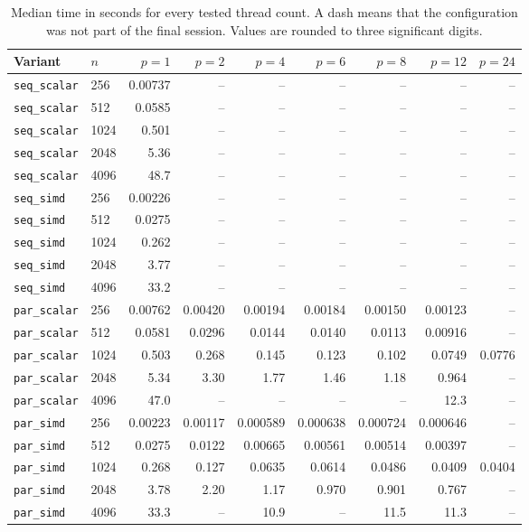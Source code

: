 \documentclass[a4paper,11pt]{article}
\begin{document}
\begin{table}[htbp]
\centering
\scriptsize
\caption{Median time in seconds for every tested thread count. A dash means
that the configuration was not part of the final session. Values are rounded
to three significant digits.}
\begin{tabular}{@{}llrrrrrrr@{}}
\toprule
Variant & $n$ & $p=1$ & $p=2$ & $p=4$ & $p=6$ & $p=8$ & $p=12$ & $p=24$\\
\midrule
\texttt{seq\_scalar} & 256 & 0.00737 & -- & -- & -- & -- & -- & --\\
\texttt{seq\_scalar} & 512 & 0.0585 & -- & -- & -- & -- & -- & --\\
\texttt{seq\_scalar} & 1024 & 0.501 & -- & -- & -- & -- & -- & --\\
\texttt{seq\_scalar} & 2048 & 5.36 & -- & -- & -- & -- & -- & --\\
\texttt{seq\_scalar} & 4096 & 48.7 & -- & -- & -- & -- & -- & --\\
\texttt{seq\_simd} & 256 & 0.00226 & -- & -- & -- & -- & -- & --\\
\texttt{seq\_simd} & 512 & 0.0275 & -- & -- & -- & -- & -- & --\\
\texttt{seq\_simd} & 1024 & 0.262 & -- & -- & -- & -- & -- & --\\
\texttt{seq\_simd} & 2048 & 3.77 & -- & -- & -- & -- & -- & --\\
\texttt{seq\_simd} & 4096 & 33.2 & -- & -- & -- & -- & -- & --\\
\texttt{par\_scalar} & 256 & 0.00762 & 0.00420 & 0.00194 & 0.00184 & 0.00150 & 0.00123 & --\\
\texttt{par\_scalar} & 512 & 0.0581 & 0.0296 & 0.0144 & 0.0140 & 0.0113 & 0.00916 & --\\
\texttt{par\_scalar} & 1024 & 0.503 & 0.268 & 0.145 & 0.123 & 0.102 & 0.0749 & 0.0776\\
\texttt{par\_scalar} & 2048 & 5.34 & 3.30 & 1.77 & 1.46 & 1.18 & 0.964 & --\\
\texttt{par\_scalar} & 4096 & 47.0 & -- & -- & -- & -- & 12.3 & --\\
\texttt{par\_simd} & 256 & 0.00223 & 0.00117 & 0.000589 & 0.000638 & 0.000724 & 0.000646 & --\\
\texttt{par\_simd} & 512 & 0.0275 & 0.0122 & 0.00665 & 0.00561 & 0.00514 & 0.00397 & --\\
\texttt{par\_simd} & 1024 & 0.268 & 0.127 & 0.0635 & 0.0614 & 0.0486 & 0.0409 & 0.0404\\
\texttt{par\_simd} & 2048 & 3.78 & 2.20 & 1.17 & 0.970 & 0.901 & 0.767 & --\\
\texttt{par\_simd} & 4096 & 33.3 & -- & 10.9 & -- & 11.5 & 11.3 & --\\
\bottomrule
\end{tabular}
\end{table}
\end{document}
